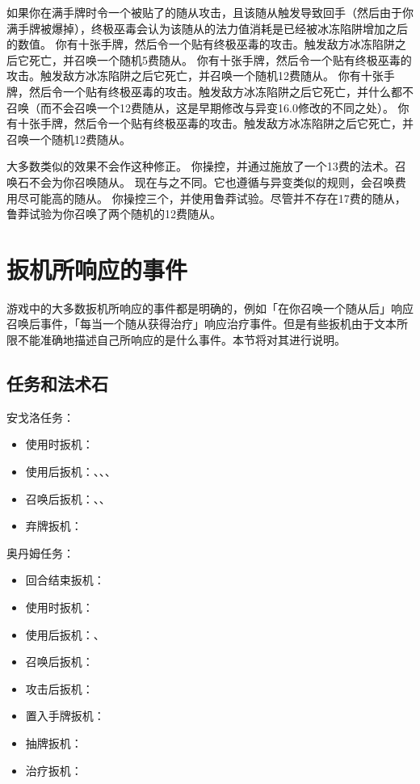 如果你在满手牌时令一个被贴了的随从攻击，且该随从触发导致回手（然后由于你满手牌被爆掉），终极巫毒会认为该随从的法力值消耗是已经被冰冻陷阱增加之后的数值。
\example 你有十张手牌，然后令一个贴有终极巫毒的攻击。触发敌方冰冻陷阱之后它死亡，并召唤一个随机5费随从。
\example {} 你有十张手牌，然后令一个贴有终极巫毒的攻击。触发敌方冰冻陷阱之后它死亡，并召唤一个随机12费随从。
\example {} 你有十张手牌，然后令一个贴有终极巫毒的攻击。触发敌方冰冻陷阱之后它死亡，并什么都不召唤（而不会召唤一个12费随从，这是早期修改与异变16.0修改的不同之处）。
\example {} 你有十张手牌，然后令一个贴有终极巫毒的攻击。触发敌方冰冻陷阱之后它死亡，并召唤一个随机12费随从。

\notice 大多数类似的效果不会作这种修正。
\example 你操控，并通过施放了一个13费的法术。召唤石不会为你召唤随从。
\exception {} 现在与之不同。它也遵循与异变类似的规则，会召唤费用尽可能高的随从。
\example 你操控三个，并使用鲁莽试验。尽管并不存在17费的随从，鲁莽试验为你召唤了两个随机的12费随从。

\setcounter{tocdepth}{1}
\section{扳机所响应的事件}

游戏中的大多数扳机所响应的事件都是明确的，例如「在你召唤一个随从后」响应召唤后事件，「每当一个随从获得治疗」响应治疗事件。但是有些扳机由于文本所限不能准确地描述自己所响应的是什么事件。本节将对其进行说明。

\subsection{任务和法术石}
安戈洛任务：
\begin{itemize}
    \item 使用时扳机：
    \item 使用后扳机：、、、
    \item 召唤后扳机：、、
    \item 弃牌扳机：
\end{itemize}

奥丹姆任务：
\begin{itemize}
    \item 回合结束扳机：
    \item 使用时扳机：
    \item 使用后扳机：、
    \item 召唤后扳机：
    \item 攻击后扳机：
    \item 置入手牌扳机：
    \item 抽牌扳机：
    \item 治疗扳机：
\end{itemize}

